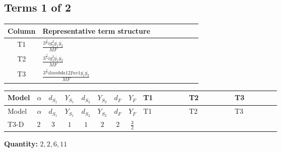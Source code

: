 \documentclass[8pt]{article}
\begin{document}
\begin{landscape}
\subsection*{Terms 1 of 2}
\begin{center}
\begin{tabular}{@{}c >{\raggedright\arraybackslash}p{0.82\linewidth}@{}}
\toprule
Column & Representative term structure \\
\midrule
T1 & \(\displaystyle \frac{3^{\frac{3}{4}} i g_{2}^{2} \overline{y_{1}} \overline{y_{2}}}{MF}\) \\
\midrule
T2 & \(\displaystyle \frac{3^{\frac{3}{4}} i g_{1}^{2} \overline{y_{1}} \overline{y_{2}}}{MF}\) \\
\midrule
T3 & \(\displaystyle \frac{3^{\frac{3}{4}} i lambda12Inv1 \overline{y_{1}} \overline{y_{2}}}{MF}\) \\
\midrule
\bottomrule
\end{tabular}
\end{center}
\smallskip
\tiny
\begin{longtable}{@{}llcccccc >{\raggedright\arraybackslash}p{0.21\linewidth} >{\raggedright\arraybackslash}p{0.21\linewidth} >{\raggedright\arraybackslash}p{0.21\linewidth}@{}}
\toprule
Model & $\alpha$ & $d_{S_1}$ & $Y_{S_1}$ & $d_{S_2}$ & $Y_{S_2}$ & $d_F$ & $Y_F$ & T1 & T2 & T3 \\
\midrule
\endfirsthead
\toprule
Model & $\alpha$ & $d_{S_1}$ & $Y_{S_1}$ & $d_{S_2}$ & $Y_{S_2}$ & $d_F$ & $Y_F$ & T1 & T2 & T3 \\
\midrule
\endhead
T3-D & $2$ & $3$ & $1$ & $1$ & $2$ & $2$ & $\frac{3}{2}$ & \scriptsize\adjustbox{max width=\linewidth}{$\begin{gathered} - \frac{11 \cdot 3^{\frac{3}{4}} i g_{2}^{2} \overline{y_{1}} \overline{y_{2}}}{8 MF}\end{gathered}$} & \scriptsize\adjustbox{max width=\linewidth}{$\begin{gathered} - \frac{9 \cdot 3^{\frac{3}{4}} i g_{1}^{2} \overline{y_{1}} \overline{y_{2}}}{8 MF}\end{gathered}$} & \scriptsize\adjustbox{max width=\linewidth}{$\begin{gathered} - \frac{3^{\frac{3}{4}} i lambda12Inv1 \overline{y_{1}} \overline{y_{2}}}{6 MF}\end{gathered}$} \\
\midrule
\bottomrule
\end{longtable}
\clearpage
\noindent\textbf{Quantity: }$\mathrm{2,2,6,11}$\par\smallskip

\end{landscape}
\end{document}
